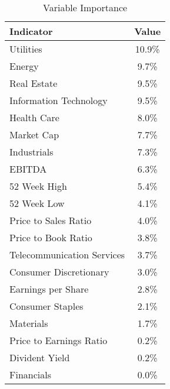 \documentclass[12pt]{article}
\begin{document}
	
	\begin{table}[h]
		\begin{minipage}{.5\linewidth}
			
			\centering
			\begin{tabular}{| l | c |}
				\hline
				\textbf{Indicator}         & \textbf{Value} \\
				\hline
				Utilities                  & 10.9\%         \\
				\hline
				Energy                     & 9.7\%          \\
				\hline
				Real Estate                & 9.5\%          \\
				\hline
				Information Technology     & 9.5\%          \\
				\hline
				Health Care                & 8.0\%          \\
				\hline
				Market Cap                 & 7.7\%          \\
				\hline
				Industrials                & 7.3\%          \\
				\hline
				EBITDA                     & 6.3\%          \\
				\hline
				52 Week High               & 5.4\%          \\
				\hline
				52 Week Low                & 4.1\%          \\
				\hline
				Price to Sales Ratio       & 4.0\%          \\
				\hline
				Price to Book Ratio        & 3.8\%          \\
				\hline
				Telecommunication Services & 3.7\%          \\
				\hline
				Consumer Discretionary     & 3.0\%          \\
				
				\hline
				Earnings per Share         & 2.8\%          \\
				\hline
				Consumer Staples           & 2.1\%          \\
				\hline
				Materials                  & 1.7\%          \\
				\hline
				Price to Earnings Ratio    & 0.2\%          \\
				\hline
				Divident Yield             & 0.2\%          \\       				\hline
								Financials             & 0.0\%          \\       				\hline
			\end{tabular}
			
			\centering
			\caption{Variable Importance }
			\label{log reg var imp}
			

\end{minipage}
\end{table}
\end{document}
